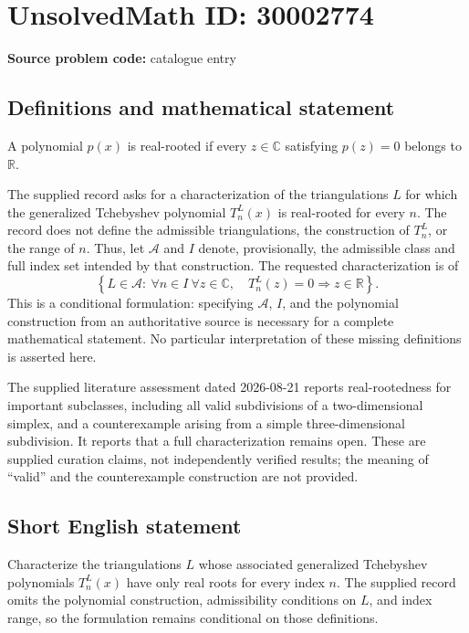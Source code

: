 \documentclass[11pt]{article}
\newcommand{\R}{\mathbb{R}}
\newcommand{\C}{\mathbb{C}}
\begin{document}
\section*{UnsolvedMath ID: 30002774}
\textbf{Source problem code:} catalogue entry
\subsection{Definitions and mathematical statement}
A polynomial \(p(x)\) is real-rooted if every \(z\in\C\) satisfying \(p(z)=0\) belongs to \(\R\).

The supplied record asks for a characterization of the triangulations \(L\) for which the generalized Tchebyshev polynomial \(T_n^L(x)\) is real-rooted for every \(n\). The record does not define the admissible triangulations, the construction of \(T_n^L\), or the range of \(n\). Thus, let \(\mathcal A\) and \(I\) denote, provisionally, the admissible class and full index set intended by that construction. The requested characterization is of
\[
\left\{L\in\mathcal A:\ \forall n\in I\ \forall z\in\C,\quad T_n^L(z)=0\Longrightarrow z\in\R\right\}.
\]
This is a conditional formulation: specifying \(\mathcal A\), \(I\), and the polynomial construction from an authoritative source is necessary for a complete mathematical statement. No particular interpretation of these missing definitions is asserted here.

The supplied literature assessment dated 2026-08-21 reports real-rootedness for important subclasses, including all valid subdivisions of a two-dimensional simplex, and a counterexample arising from a simple three-dimensional subdivision. It reports that a full characterization remains open. These are supplied curation claims, not independently verified results; the meaning of ``valid'' and the counterexample construction are not provided.
\subsection{Short English statement}
Characterize the triangulations \(L\) whose associated generalized Tchebyshev polynomials \(T_n^L(x)\) have only real roots for every index \(n\). The supplied record omits the polynomial construction, admissibility conditions on \(L\), and index range, so the formulation remains conditional on those definitions.
\end{document}
